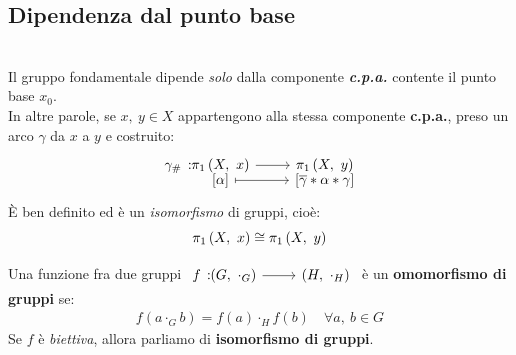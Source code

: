 \subsection{Dipendenza dal punto base}
\begin{theorema}~{}\label{dipendenzaptobasegruf}\\
Il gruppo fondamentale dipende \textit{solo} dalla componente \textit{\textbf{c.p.a.}} contente il punto base $x_0$.\\
In altre parole, se $x,\ y\in X$ appartengono alla stessa componente \textbf{c.p.a.}, preso un arco $\gamma$ da $x$ a $y$ e costruito:
	\begin{equation}
		\funztot{\gamma_{\#}}{\gruf{X}{x}}{\gruf{X}{y}}{\left[\alpha\right]}{\left[\overline{\gamma}\ast\alpha\ast\gamma\right]}
	\end{equation}
	È ben definito ed è un \textit{isomorfismo} di gruppi, cioè:
	\begin{equation}
		\gruf{X}{x}\cong\gruf{X}{y}
	\end{equation}
\vspace{-6mm}
\end{theorema}
\begin{remember}
	Una funzione fra due gruppi $\funz{f}{\left(G,\ \cdot_G\right)}{\left(H,\ \cdot_H\right)}$ è un \textbf{omomorfismo di gruppi} se:
	\begin{gather*}
		f\left(a\cdot_G b\right)=f\left(a\right)\cdot_H f\left(b\right)\quad \forall a,\ b\in G
	\end{gather*}
	Se $f$ è \textit{biettiva}, allora parliamo di \textbf{isomorfismo di gruppi}.
\end{remember}
